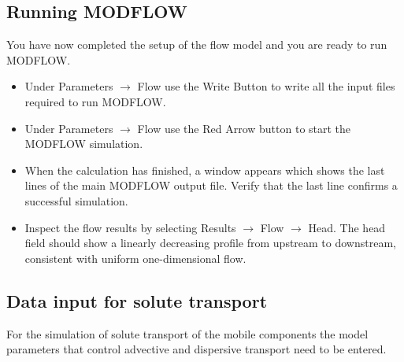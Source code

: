 \subsection{Running MODFLOW}

You have now completed the setup of the flow model and you are ready
to run MODFLOW.

\begin{itemize}

\item Under {\color{blue}Parameters} $\rightarrow$ {\color{blue}Flow}
use the {\color{blue}Write Button} to write all the input files
required to run MODFLOW.

\item Under {\color{blue}Parameters} $\rightarrow$ {\color{blue}Flow}
use the {\color{blue}Red Arrow} button to start the MODFLOW simulation.

\item When the calculation has finished, a window appears which shows
the last lines of the main MODFLOW output file.
Verify that the last line confirms a successful simulation.

\item Inspect the flow results by selecting
{\color{blue}Results} $\rightarrow$
{\color{blue}Flow} $\rightarrow$
{\color{blue}Head}.
The head field should show a linearly decreasing profile from upstream
to downstream, consistent with uniform one-dimensional flow.

\end{itemize}

\subsection[Data input for solute transport]{Data input for solute transport}

For the simulation of solute transport of the mobile components the
model parameters that control advective and dispersive transport
need to be entered.

